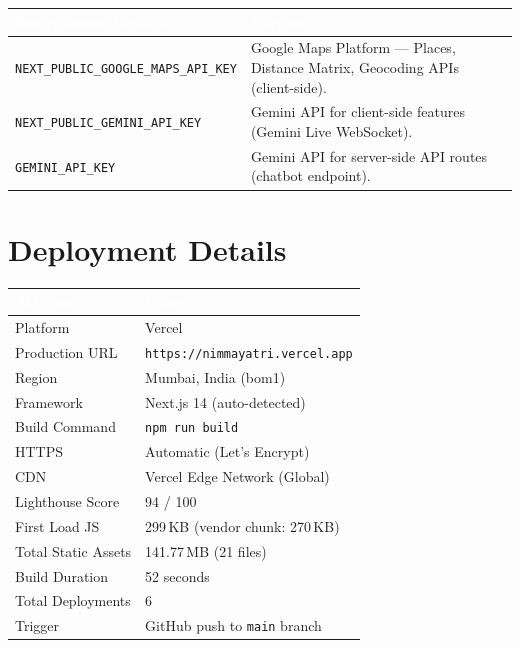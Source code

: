 \documentclass[12pt,a4paper,oneside]{report}
\begin{document}
\vspace{6pt}
\begin{center}
\begin{tabular}{|L{0.46\textwidth}|L{0.49\textwidth}|}
\hline
{}
\textcolor{white}{\textbf{Environment Variable}} &
\textcolor{white}{\textbf{Purpose}} \\
\hline
{\small\texttt{NEXT\_PUBLIC\_GOOGLE\_MAPS\_API\_KEY}} &
  Google Maps Platform --- Places, Distance Matrix, Geocoding APIs (client-side). \\
{\small\texttt{NEXT\_PUBLIC\_GEMINI\_API\_KEY}} &
  Gemini API for client-side features (Gemini Live WebSocket). \\
{\small\texttt{GEMINI\_API\_KEY}} &
  Gemini API for server-side API routes (chatbot endpoint). \\
\hline
\end{tabular}
\end{center}

\section{Deployment Details}

\vspace{6pt}
\begin{center}
\begin{tabular}{|L{0.34\textwidth}|L{0.61\textwidth}|}
\hline
{}
\textcolor{white}{\textbf{Attribute}} &
\textcolor{white}{\textbf{Value}} \\
\hline
Platform           & Vercel \\
Production URL     & \texttt{https://nimmayatri.vercel.app} \\
Region             & Mumbai, India (bom1) \\
Framework          & Next.js 14 (auto-detected) \\
Build Command      & \texttt{npm run build} \\
HTTPS              & Automatic (Let's Encrypt) \\
CDN                & Vercel Edge Network (Global) \\
Lighthouse Score   & 94 / 100 \\
First Load JS      & 299\,KB (vendor chunk: 270\,KB) \\
Total Static Assets& 141.77\,MB (21 files) \\
Build Duration     & 52 seconds \\
Total Deployments  & 6 \\
Trigger            & GitHub push to \texttt{main} branch \\
\hline
\end{tabular}
\end{center}
\end{document}
